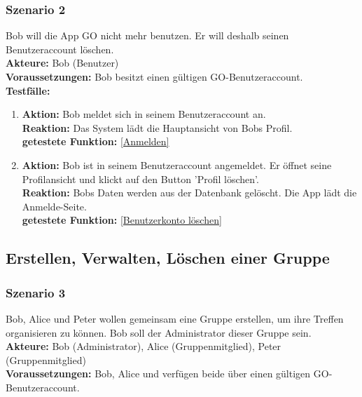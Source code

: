 \documentclass[parskip=full]{scrartcl}
\def\threedigits#1{%
  \ifnum#1<100 0\fi
  \ifnum#1<10 0\fi
  \number#1}
\begin{document}
\subsubsection*{Szenario 2}Bob will die App GO nicht mehr benutzen. Er will deshalb seinen Benutzeraccount löschen. \\

\textbf{Akteure:} Bob (Benutzer) \\

\textbf{Voraussetzungen: }Bob besitzt einen gültigen GO-Benutzeraccount.\\

\textbf{Testfälle:}
\begin{enumerate}[label={\textbf{/T\protect\threedigits{\theenumi}0/}}, leftmargin=*, resume]
	\item \textbf{Aktion:} Bob meldet sich in seinem Benutzeraccount an. \\
	\textbf{Reaktion:} Das System lädt die Hauptansicht von Bobs Profil.\\
	\textbf{getestete Funktion:} \ref{Anmelden}
	\item \textbf{Aktion:} Bob ist in seinem Benutzeraccount angemeldet. Er öffnet seine Profilansicht und klickt auf den Button 'Profil löschen'.\\
	\textbf{Reaktion:} Bobs Daten werden aus der Datenbank gelöscht. Die App lädt die Anmelde-Seite.\\
	\textbf{getestete Funktion:} \ref{Benutzerkonto löschen}
\end{enumerate}

\subsection{Erstellen, Verwalten, Löschen einer Gruppe}

\subsubsection*{Szenario 3} Bob, Alice und Peter wollen gemeinsam eine Gruppe erstellen, um ihre Treffen organisieren zu können. Bob soll der Administrator dieser Gruppe sein.\\

\textbf{Akteure:} Bob (Administrator), Alice (Gruppenmitglied), Peter (Gruppenmitglied) \\

\textbf{Voraussetzungen: }Bob, Alice und verfügen beide über einen gültigen GO-Benutzeraccount.\\
\end{document}
